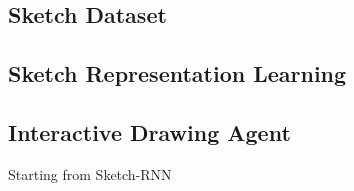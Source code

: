 \subsection{Sketch Dataset}

\subsection{Sketch Representation Learning}


\subsection{Interactive Drawing Agent}
Starting from Sketch-RNN